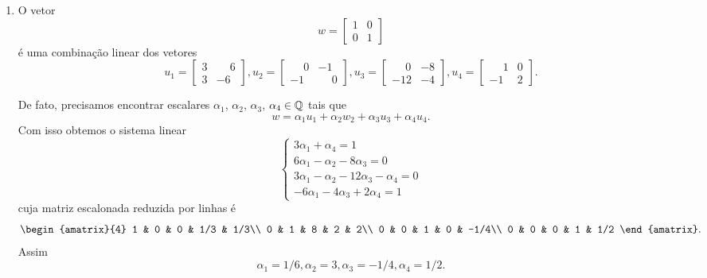 \begin{exemplo}
\begin{enumerate}[label={\arabic*})]
		    \item O vetor
		    	\[
		    		w = \begin{bmatrix}
		    			1 & 0\\
		    			0 & 1
		    		\end{bmatrix}
		    	\]
		    	é uma combinação linear dos vetores
		    	\[
		    		u_1 = \begin{bmatrix}3 & \phantom{-}6\\3 & -6\end{bmatrix},
		    		u_2 = \begin{bmatrix}\phantom{-}0 & -1\\-1 & \phantom{-}0\end{bmatrix},
		    		u_3 = \begin{bmatrix}\phantom{-}0 & -8\\-12 & -4\end{bmatrix},
		    		u_4 = \begin{bmatrix}\phantom{-}1 & 0\\-1 & 2\end{bmatrix}.
		    	\]
		    	\begin{solucao}
		    		De fato, precisamos encontrar escalares $\alpha_1$, $\alpha_2$, $\alpha_3$, $\alpha_4 \in \mathbb{Q}$ tais que
		    		\[ w = \alpha_1 u_1 + \alpha_2 w_2 + \alpha_3 u_3 + \alpha_4 u_4.\]
		    		Com isso obtemos o sistema linear
		    		\[
		    			\begin{cases}
		    				3\alpha_1 + \alpha_4 = 1\\
		    				6\alpha_1 - \alpha_2 - 8\alpha_3 = 0\\
		    				3\alpha_1 - \alpha_2 - 12 \alpha_3 - \alpha_4 = 0\\
		    				-6\alpha_1 - 4\alpha_3 + 2\alpha_4 = 1
		    			\end{cases}
		    		\]
		    		cuja matriz escalonada reduzida por linhas é
		    		\[
		    			\begin{amatrix}{4}
		    				1 & 0 & 0 & 1/3 & 1/3\\
		    				0 & 1 & 8 & 2 & 2\\
		    				0 & 0 & 1 & 0 & -1/4\\
		    				0 & 0 & 0 & 1 & 1/2
		    			\end{amatrix}.
		    		\]
		    		Assim
		    		\[\alpha_1 = 1/6, \alpha_2 = 3, \alpha_3 = -1/4, \alpha_4 = 1/2.\]
		    	\end{solucao}
	\end{enumerate}
\end{exemplo}

